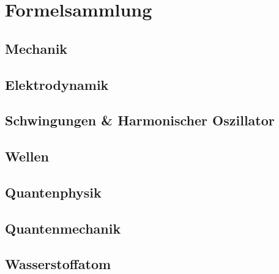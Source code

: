 \section{Formelsammlung}%
\label{frml:sec:formelsammlung}

\subsection{Mechanik}%
\label{frml:sub:mechanik}

\subsection{Elektrodynamik}%
\label{frml:sub:elektrodynamik}

\subsection{Schwingungen \& Harmonischer Oszillator}%
\label{frml:sub:schwingungen_harmonischer_oszillator}

\subsection{Wellen}%
\label{frml:sub:wellen}

\subsection{Quantenphysik}%
\label{frml:sub:quantenphysik}

\subsection{Quantenmechanik}%
\label{frml:sub:quantenmechanik}

\subsection{Wasserstoffatom}%
\label{frml:sub:wasserstoffatom}

